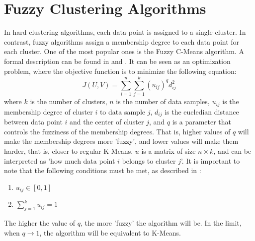 \documentclass[conference]{IEEEtran}
\begin{document}
\section{Fuzzy Clustering Algorithms}
In hard clustering algorithms, each data point is assigned to a single cluster. In contrast, fuzzy algorithms assign a membership degree to each data point for each cluster.
One of the most popular ones is the Fuzzy C-Means algorithm. A formal description can be found in \cite{bookpatternrecognition} and \cite{BEZDEK1984191}. It can be seen as an optimization problem,
where the objective function is to minimize the following equation:
\begin{equation}
J(U, V) = \sum_{i=1}^{n} \sum_{j=1}^{k} (u_{ij})^q d_{ij}^2
\end{equation}
where $k$ is the number of clusters, $n$ is the number of data samples, $u_{ij}$ is the membership degree of cluster $i$ to data sample $j$,
$d_{ij}$ is the eucledian distance between data point $i$ and the center of cluster $j$, and $q$ is a parameter that controls the fuzziness of the membership degrees.
That is, higher values of $q$ will make the membership degrees more 'fuzzy', and lower values will make them harder, that is, closer to regular K-Means.
$u$ is a matrix of size $n \times k$, and can be interpreted as 'how much data point $i$ belongs to cluster $j$'.
It is important to note that the following conditions must be met, as described in \cite{BEZDEK1984191}:
\begin{enumerate}
    \item $u_{ij} \in [0, 1]$
    \item $\sum_{j=1}^{k} u_{ij} = 1$
\end{enumerate}
The higher the value of $q$, the more 'fuzzy' the algorithm will be. In the limit, when $q \rightarrow 1$, the algorithm will be equivalent to K-Means.
\end{document}
